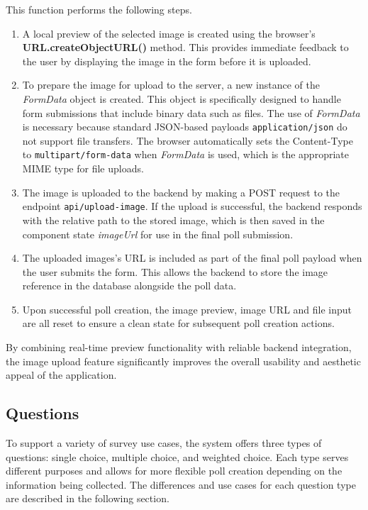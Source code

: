 \documentclass[a4paper,12pt]{report}
\begin{document}
This function performs the following steps.
\begin{enumerate}
	\item A local preview of the selected image is created using the browser's \textbf{URL.createObjectURL()} method. This provides immediate feedback to the user by displaying the image in the form before it is uploaded.
	\item To prepare the image for upload to the server, a new instance of the \textit{FormData} object is created. This object is specifically designed to handle form submissions that include binary data such as files. The use of \textit{FormData} is necessary because standard JSON-based payloads \texttt{application/json} do not support file transfers. The browser automatically sets the Content-Type to \texttt{multipart/form-data} when \textit{FormData} is used, which is the appropriate MIME type for file uploads.
	\item The image is uploaded to the backend by making a POST request to the endpoint \texttt{api/upload-image}. If the upload is successful, the backend responds with the relative path to the stored image, which is then saved in the component state \textit{imageUrl} for use in the final poll submission.
	\item The uploaded images's URL is included as part of the final poll payload when the user submits the form. This allows the backend to store the image reference in the database alongside the poll data.
	\item Upon successful poll creation, the image preview, image URL and file input are all reset to ensure a clean state for subsequent poll creation actions.
\end{enumerate}
By combining real-time preview functionality with reliable backend integration, the image upload feature significantly improves the overall usability and aesthetic appeal of the application. \\
\subsection{Questions}
To support a variety of survey use cases, the system offers three types of questions: single choice, multiple choice, and weighted choice. Each type serves different purposes and allows for more flexible poll creation depending on the information being collected. The differences and use cases for each question type are described in the following section.
\end{document}
